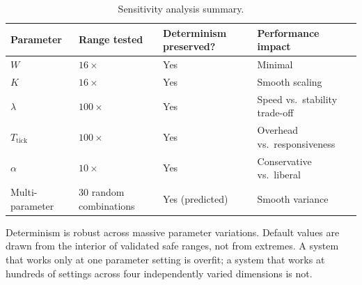\begin{table}[h]
\centering
\caption{Sensitivity analysis summary.}
\begin{tabular}{llll}
\toprule
\textbf{Parameter} & \textbf{Range tested} & \textbf{Determinism preserved?} & \textbf{Performance impact} \\
\midrule
$W$ & $16\times$ & Yes & Minimal \\
$K$ & $16\times$ & Yes & Smooth scaling \\
$\lambda$ & $100\times$ & Yes & Speed vs.\ stability trade-off \\
$T_{\text{tick}}$ & $100\times$ & Yes & Overhead vs.\ responsiveness \\
$\alpha$ & $10\times$ & Yes & Conservative vs.\ liberal \\
Multi-parameter & 30 random combinations & Yes (predicted) & Smooth variance \\
\bottomrule
\end{tabular}
\end{table}

Determinism is robust across massive parameter variations. Default values are
drawn from the interior of validated safe ranges, not from extremes. A system
that works only at one parameter setting is overfit; a system that works at
hundreds of settings across four independently varied dimensions is not.
